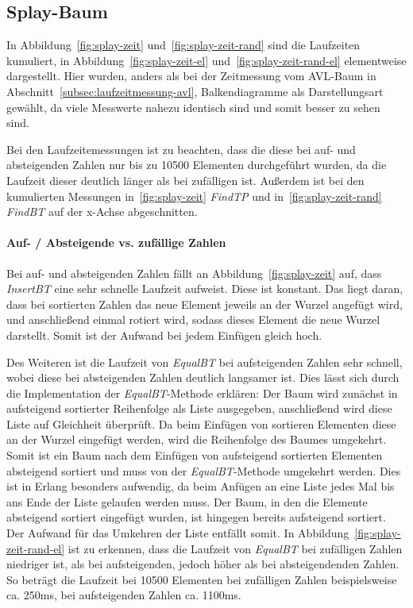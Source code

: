 \subsection{Splay-Baum}
In Abbildung~\ref{fig:splay-zeit} und~\ref{fig:splay-zeit-rand} sind die Laufzeiten
kumuliert, in Abbildung~\ref{fig:splay-zeit-el} und~\ref{fig:splay-zeit-rand-el}
elementweise dargestellt.
Hier wurden, anders als bei der Zeitmessung vom AVL-Baum in
Abschnitt~\ref{subsec:laufzeitmessung-avl}, Balkendiagramme als Darstellungsart gewählt, da viele
Messwerte nahezu identisch sind und somit besser zu sehen sind.

Bei den Laufzeitemessungen ist zu beachten, dass die diese bei auf- und absteigenden
Zahlen nur bis zu 10500 Elementen durchgeführt wurden, da die Laufzeit dieser deutlich
länger als bei zufälligen ist.
Außerdem ist bei den kumulierten Messungen in~\ref{fig:splay-zeit} \textit{FindTP} und
in~\ref{fig:splay-zeit-rand} \textit{FindBT} auf der x-Achse abgeschnitten.

\paragraph{Auf- / Absteigende vs. zufällige Zahlen}
Bei auf- und absteigenden Zahlen fällt an Abbildung~\ref{fig:splay-zeit} auf, dass \textit{InsertBT}
eine sehr schnelle Laufzeit aufweist.
Diese ist konstant.
Das liegt daran, dass bei sortierten Zahlen das neue Element jeweils an
der Wurzel angefügt wird, und anschließend einmal rotiert wird, sodass dieses Element die
neue Wurzel darstellt.
Somit ist der Aufwand bei jedem Einfügen gleich hoch.

Des Weiteren ist die Laufzeit von \textit{EqualBT} bei aufsteigenden Zahlen sehr schnell,
wobei diese bei absteigenden Zahlen deutlich langsamer ist.
Dies lässt sich durch die Implementation der \textit{EqualBT}-Methode erklären:
Der Baum wird zunächst in aufsteigend sortierter Reihenfolge als Liste ausgegeben,
anschließend wird diese Liste auf Gleichheit überprüft.
Da beim Einfügen von sortieren Elementen diese an der Wurzel eingefügt werden, wird die
Reihenfolge des Baumes umgekehrt.
Somit ist ein Baum nach dem Einfügen von aufsteigend sortierten Elementen absteigend sortiert
und muss von der \textit{EqualBT}-Methode umgekehrt werden.
Dies ist in Erlang besonders aufwendig, da beim Anfügen an eine Liste jedes Mal bis ans Ende
der Liste gelaufen werden muss.
Der Baum, in den die Elemente absteigend sortiert eingefügt wurden, ist hingegen bereits
aufsteigend sortiert.
Der Aufwand für das Umkehren der Liste entfällt somit.
In Abbildung~\ref{fig:splay-zeit-rand-el} ist zu erkennen, dass die
Laufzeit von \textit{EqualBT} bei zufälligen Zahlen niedriger ist,
als bei aufsteigenden, jedoch höher als bei absteigendenden Zahlen.
So beträgt die Laufzeit bei 10500 Elementen bei zufälligen Zahlen beispielsweise ca. 250ms,
bei aufsteigenden Zahlen ca. 1100ms.


